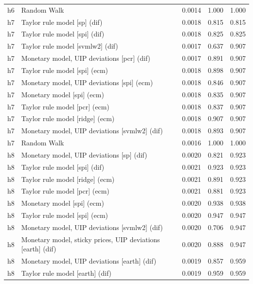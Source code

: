 \begin{ThreePartTable}
\begin{longtable}[t]{cp{5.5cm}ccc}
h6 & \raggedright Random Walk & 0.0014 & 1.000 & 1.000\\
\addlinespace
h7 & \raggedright Taylor rule model [sp] (dif) & 0.0018 & 0.815 & 0.815\\
h7 & \raggedright Taylor rule model [spi] (dif) & 0.0018 & 0.825 & 0.825\\
h7 & \raggedright Taylor rule model [svmlw2] (dif) & 0.0017 & 0.637 & 0.907\\
h7 & \raggedright Monetary model, UIP deviations [pcr] (dif) & 0.0017 & 0.891 & 0.907\\
h7 & \raggedright Taylor rule model [spi] (ecm) & 0.0018 & 0.898 & 0.907\\
h7 & \raggedright Monetary model, UIP deviations [spi] (ecm) & 0.0018 & 0.846 & 0.907\\
h7 & \raggedright Monetary model [spi] (ecm) & 0.0018 & 0.835 & 0.907\\
h7 & \raggedright Taylor rule model [pcr] (ecm) & 0.0018 & 0.837 & 0.907\\
h7 & \raggedright Taylor rule model [ridge] (ecm) & 0.0018 & 0.907 & 0.907\\
h7 & \raggedright Monetary model, UIP deviations [svmlw2] (dif) & 0.0018 & 0.893 & 0.907\\
h7 & \raggedright Random Walk & 0.0016 & 1.000 & 1.000\\
\addlinespace
h8 & \raggedright Monetary model, UIP deviations [sp] (dif) & 0.0020 & 0.821 & 0.923\\
h8 & \raggedright Taylor rule model [spi] (dif) & 0.0021 & 0.923 & 0.923\\
h8 & \raggedright Taylor rule model [ridge] (ecm) & 0.0021 & 0.891 & 0.923\\
h8 & \raggedright Taylor rule model [pcr] (ecm) & 0.0021 & 0.881 & 0.923\\
h8 & \raggedright Monetary model [spi] (ecm) & 0.0020 & 0.938 & 0.938\\
h8 & \raggedright Taylor rule model [spi] (ecm) & 0.0020 & 0.947 & 0.947\\
h8 & \raggedright Monetary model, UIP deviations [svmlw2] (dif) & 0.0020 & 0.706 & 0.947\\
h8 & \raggedright Monetary model, sticky prices, UIP deviations [earth] (dif) & 0.0020 & 0.888 & 0.947\\
h8 & \raggedright Monetary model, UIP deviations [earth] (dif) & 0.0019 & 0.857 & 0.959\\
h8 & \raggedright Taylor rule model [earth] (dif) & 0.0019 & 0.959 & 0.959\\

\end{longtable}
\end{ThreePartTable}
